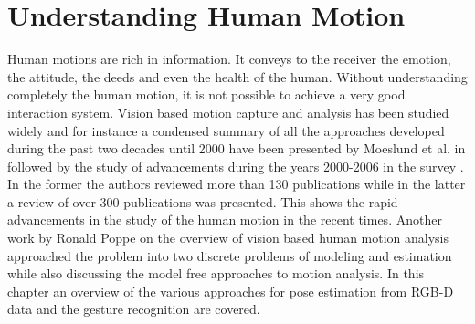 
\chapter{Understanding Human Motion} %

\label{Chapter3} %


 Human motions are rich in information. It conveys to the receiver the emotion, the attitude, the deeds and even the health of the human. Without understanding completely the human motion, it is not possible to achieve a very good interaction system.  Vision based motion capture and analysis has been studied widely and for instance a condensed summary of all the approaches developed during the past two decades until 2000 have been presented by Moeslund et al. in \cite{Moeslund2001231} followed by the study of advancements during the years 2000-2006 in the survey \cite{Moeslund200690}. In the former the authors reviewed more than 130 publications while in the latter a review of over 300 publications was presented. This shows the rapid advancements in the study of the human motion in the recent times. Another work by Ronald Poppe\cite{Poppe20074} on the overview of vision based human motion analysis approached the problem into two discrete problems of modeling and estimation while also discussing the model free approaches to motion analysis. In this chapter an overview of the various approaches for pose estimation from RGB-D data and the gesture recognition are covered.
